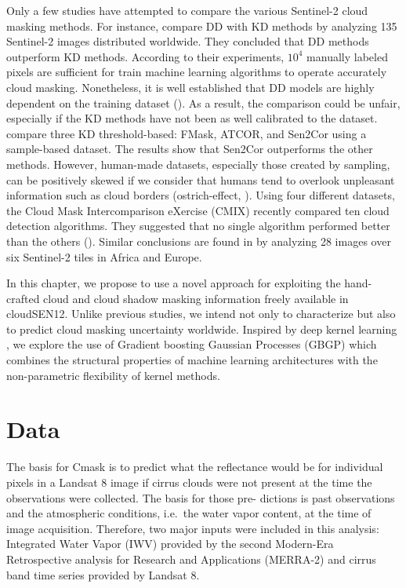 \documentclass[a4paper, nobind]{templates/cdethesis}
\begin{document}
Only a few studies have attempted to compare the various Sentinel-2 cloud masking methods. For instance, \cite{Cilli} compare DD with KD methods by analyzing 135 Sentinel-2 images distributed worldwide. They concluded that DD methods outperform KD methods. According to their experiments, \(10^{4}\) manually labeled pixels are sufficient for train machine learning algorithms to operate accurately cloud masking. Nonetheless, it is well established that DD models are highly dependent on the training dataset (\cite{Lopez-Puigdollers2021}). As a result, the comparison could be unfair, especially if the KD methods have not been as well calibrated to the dataset. \cite{Zekoll2021} compare three KD threshold-based: FMask, ATCOR, and Sen2Cor using a sample-based dataset. The results show that Sen2Cor outperforms the other methods. However, human-made datasets, especially those created by sampling, can be positively skewed if we consider that humans tend to overlook unpleasant information such as cloud borders (ostrich-effect, \cite{Valdez2017}). Using four different datasets, the Cloud Mask Intercomparison eXercise (CMIX) recently compared ten cloud detection algorithms. They suggested that no single algorithm performed better than the others (\cite{skakun2022cloud}). Similar conclusions are found in \cite{tarrio2020comparison} by analyzing 28 images over six Sentinel-2 tiles in Africa and Europe.

In this chapter, we propose to use a novel approach for exploiting the hand-crafted cloud and cloud shadow masking information freely available in cloudSEN12. Unlike previous studies, we intend not only to characterize but also to predict cloud masking uncertainty worldwide. Inspired by deep kernel learning \cite{wilson2016deep}, we explore the use of Gradient boosting Gaussian Processes (GBGP) which combines the structural properties of machine learning architectures with the non-parametric flexibility of kernel methods.

\hypertarget{data}{%
\section{Data}\label{data}}

The basis for Cmask is to predict what the reflectance would be for individual pixels in a Landsat 8 image if cirrus clouds were not present at the time the observations were collected. The basis for those pre- dictions is past observations and the atmospheric conditions, i.e.~the water vapor content, at the time of image acquisition. Therefore, two major inputs were included in this analysis: Integrated Water Vapor (IWV) provided by the second Modern-Era Retrospective analysis for Research and Applications (MERRA-2) and cirrus band time series provided by Landsat 8.
\end{document}

